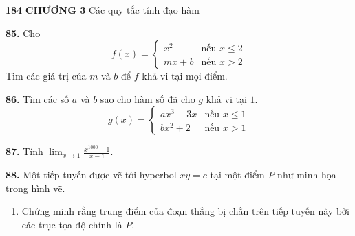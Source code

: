 \noindent
{\small\textbf{184} \quad \textbf{\textsf{CHƯƠNG 3}} \quad \textsf{Các quy tắc tính đạo hàm}}
\vspace{10pt}

\noindent
\begin{minipage}[t]{0.48\textwidth}
  \noindent\textbf{85.} Cho
  \[
  f(x) = \begin{cases}
    x^2 & \text{nếu } x \le 2 \\
    mx + b & \text{nếu } x > 2
  \end{cases}
  \]
  Tìm các giá trị của $m$ và $b$ để $f$ khả vi tại mọi điểm.

  \vspace{10pt}
  \noindent\textbf{86.} Tìm các số $a$ và $b$ sao cho hàm số đã cho $g$ khả vi tại $1$.
  \[
  g(x) = \begin{cases}
    ax^3 - 3x & \text{nếu } x \le 1 \\
    bx^2 + 2 & \text{nếu } x > 1
  \end{cases}
  \]

  \vspace{8pt}
  \noindent\textbf{87.} Tính $\displaystyle \lim_{x \to 1} \frac{x^{1000} - 1}{x - 1}$.

  \vspace{12pt}
  \noindent\textbf{88.} Một tiếp tuyến được vẽ tới hyperbol $xy = c$ tại một điểm $P$ như minh họa trong hình vẽ.
  \begin{enumerate}[label=(\alph*), leftmargin=*, itemsep=2pt, topsep=3pt]
    \item Chứng minh rằng trung điểm của đoạn thẳng bị chắn trên tiếp tuyến này bởi các trục tọa độ chính là $P$.
  \end{enumerate}
\end{minipage}%
\hfill
